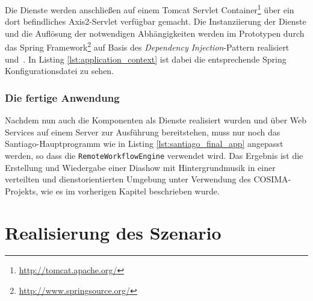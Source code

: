   

  Die Dienste werden anschließen auf einem Tomcat Servlet Container\footnote{\url{http://tomcat.apache.org/}} über ein dort befindliches Axis2-Servlet verfügbar gemacht. Die Instanziierung der Dienste und die Auflösung der notwendigen Abhängigkeiten werden im Prototypen durch das Spring Framework\footnote{\url{http://www.springsource.org/}} auf Basis des \emph{Dependency Injection}-Pattern realisiert~\citep[S. 130]{johnson2004eoo} und~\citep{fowler04di}. In Listing \ref{lst:application_context} ist dabei die entsprechende Spring Konfigurationsdatei zu sehen.

  
  

\subsubsection{Die fertige Anwendung} %
\label{ssub:die_fertige_anwendung}

  Nachdem nun auch die Komponenten als Dienste realisiert wurden und über Web Services auf einem Server zur Ausführung bereitstehen, muss nur noch das Santiago-Hauptprogramm wie in Listing \ref{lst:santiago_final_app} angepasst werden, so dass die \verb!RemoteWorkflowEngine! verwendet wird. Das Ergebnis ist die Erstellung und Wiedergabe einer Diashow mit Hintergrundmusik in einer verteilten und dienstorientierten Umgebung unter Verwendung des COSIMA-Projekts, wie es im vorherigen Kapitel beschrieben wurde.

  
  

  

\section{Realisierung des Szenario} %
\label{sec:realisierung_des_szenario}

